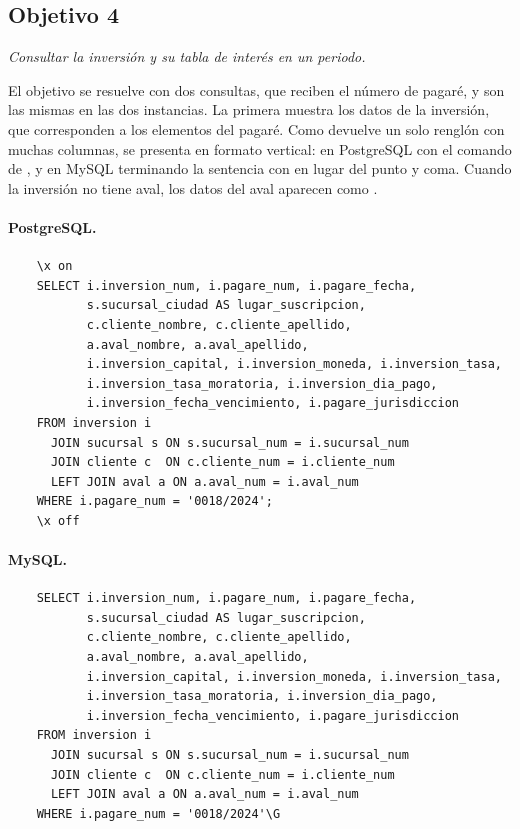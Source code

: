 
\subsection{Objetivo 4}

\textit{Consultar la inversi\'on y su tabla de inter\'es en un periodo.}

El objetivo se resuelve con dos consultas, que reciben el n\'umero de pagar\'e, y son las mismas en las dos instancias. La primera muestra los datos de la inversi\'on, que corresponden a los elementos del pagar\'e. Como devuelve un solo rengl\'on con muchas columnas, se presenta en formato vertical: en PostgreSQL con el comando  de , y en MySQL terminando la sentencia con  en lugar del punto y coma. Cuando la inversi\'on no tiene aval, los datos del aval aparecen como .

\paragraph{PostgreSQL.}

\begin{verbatim}
	\x on
	SELECT i.inversion_num, i.pagare_num, i.pagare_fecha,
	       s.sucursal_ciudad AS lugar_suscripcion,
	       c.cliente_nombre, c.cliente_apellido,
	       a.aval_nombre, a.aval_apellido,
	       i.inversion_capital, i.inversion_moneda, i.inversion_tasa,
	       i.inversion_tasa_moratoria, i.inversion_dia_pago,
	       i.inversion_fecha_vencimiento, i.pagare_jurisdiccion
	FROM inversion i
	  JOIN sucursal s ON s.sucursal_num = i.sucursal_num
	  JOIN cliente c  ON c.cliente_num = i.cliente_num
	  LEFT JOIN aval a ON a.aval_num = i.aval_num
	WHERE i.pagare_num = '0018/2024';
	\x off
\end{verbatim}

\paragraph{MySQL.}

\begin{verbatim}
	SELECT i.inversion_num, i.pagare_num, i.pagare_fecha,
	       s.sucursal_ciudad AS lugar_suscripcion,
	       c.cliente_nombre, c.cliente_apellido,
	       a.aval_nombre, a.aval_apellido,
	       i.inversion_capital, i.inversion_moneda, i.inversion_tasa,
	       i.inversion_tasa_moratoria, i.inversion_dia_pago,
	       i.inversion_fecha_vencimiento, i.pagare_jurisdiccion
	FROM inversion i
	  JOIN sucursal s ON s.sucursal_num = i.sucursal_num
	  JOIN cliente c  ON c.cliente_num = i.cliente_num
	  LEFT JOIN aval a ON a.aval_num = i.aval_num
	WHERE i.pagare_num = '0018/2024'\G
\end{verbatim}

